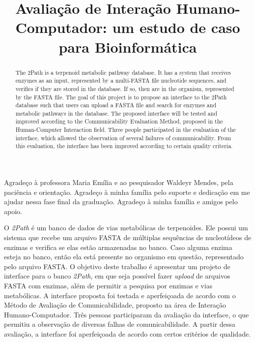 \documentclass[bacharelado]{unb-cic}
\title{Avaliação de Interação Humano-Computador: um estudo de caso para Bioinformática}
\begin{document}
  \maketitle
  \pretextual

  

  \begin{agradecimentos}
  Agradeço à professora Maria Emília e ao pesquisador Waldeyr Mendes, pela paciência e orientação. Agradeço à minha família pelo suporte e dedicação em me ajudar nessa fase final da graduação. Agradeço à minha família e amigos pelo apoio.
  \end{agradecimentos}

  \begin{resumo}
  O \textit{2Path} é um banco de dados de vias metabólicas de terpenoides. Ele possui um sistema que recebe um arquivo FASTA de múltiplas sequências de nucleotídeos de enzimas e verifica se elas estão armazenadas no banco. Caso alguma enzima esteja no banco, então ela está presente no organismo em questão, representado pelo arquivo FASTA. O objetivo deste trabalho é apresentar um projeto de interface para o banco \textit{2Path}, em que seja possível fazer \textit{upload} de arquivos FASTA com enzimas, além de permitir a pesquisa por enzimas e vias metabólicas. A interface proposta foi testada e aperfeiçoada de acordo com o Método de Avaliação de Comunicabilidade, proposto na área de Interação Humano-Computador. Três pessoas participaram da avaliação da interface, o que permitiu a observação de diversas falhas de comunicabilidade. A partir dessa avaliação, a interface foi aperfeiçoada de acordo com certos critérios de qualidade.
  \end{resumo}

  \begin{abstract}
  The 2Path is a terpenoid metabolic pathway database. It has a system that receives enzymes as an input, represented by a multi-FASTA file nucleotide sequences, and verifies if they are stored in the database. If so, then are in the organism, represented by the FASTA file. The goal of this project is to propose an interface to the 2Path database such that users can upload a FASTA file and search for enzymes and metabolic pathways in the database. The proposed interface will be tested and improved according to the Communicability Evaluation Method, proposed in the Human-Computer Interaction field. Three people participated in the evaluation of the interface, which allowed the observation of several failures of communicability. From this evaluation, the interface has been improved according to certain quality criteria.
  \end{abstract}
\end{document}
